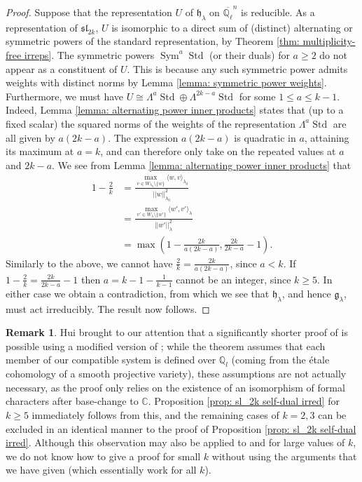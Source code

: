 \documentclass{amsart}
\theoremstyle{definition}
\newtheorem{remark}[theorem]{Remark}
\numberwithin{equation}{section} %
\newcommand{\sllie}{\mathfrak{sl}}
\newcommand{\Sym}{\operatorname{Sym}}
\newcommand{\Std}{\operatorname{Std}}
\newcommand{\Qlbar}{\ensuremath{\overline{\mathbb{Q}_\ell}}}
\newcommand{\bb}[1]{\mathbb{#1}}
\newcommand{\mf}[1]{\mathfrak{#1}}
\begin{document}
\begin{proof}
Suppose that the representation $U$ of $\mf{h}_\lambda$ on $\Qlbar^n$ is reducible.
As a representation of $\sllie_{2k}$, $U$ is isomorphic to a direct sum of (distinct) alternating or symmetric powers of the standard representation, by Theorem \ref{thm: multiplicity-free irreps}.
The symmetric powers $\Sym^a \Std$ (or their duals) for $a \geq 2$ do not appear as a constituent of $U$.
This is because any such symmetric power admits weights with distinct norms by Lemma \ref{lemma: symmetric power weights}.
Furthermore, we must have $U \cong \Lambda^a \Std \oplus \Lambda^{2k-a} \Std$ for some $1 \leq a \leq k-1$.
Indeed, Lemma \ref{lemma: alternating power inner products} states that (up to a fixed scalar) the squared norms of the weights of the representation $\Lambda^a \Std$ are all given by $a(2k-a)$. 
The expression $a(2k-a)$ is quadratic in $a$, attaining its maximum at $a = k$, and can therefore only take on the repeated values at $a$ and $2k-a$.
We see from Lemma \ref{lemma: alternating power inner products} that
\begin{align*}
 1 - \frac{2}{k} &= \frac{\max_{v \in W_{\lambda_0} \setminus \{w\}} \langle w, v \rangle_{\lambda_0}}{||w||_{\lambda_0}^2} \\
 &= \frac{\max_{v' \in W_{\lambda} \setminus \{w'\}} \langle w', v' \rangle_{\lambda}}{||w'||_{\lambda}^2} \\
 &= \max(1- \frac{2k}{a(2k-a)},\frac{2k}{2k-a} - 1).
\end{align*}
Similarly to the above, we cannot have $\frac{2}{k} = \frac{2k}{a(2k-a)}$, since $a < k$.
If $1- \frac{2}{k} = \frac{2k}{2k-a} - 1$ then $a = k-1 - \frac{1}{k-1}$ cannot be an integer, since $k \geq 5$.
In either case we obtain a contradiction, from which we see that $\mf{h}_\lambda$, and hence $\mf{g}_\lambda$, must  act irreducibly.
The result now follows.
\end{proof}

\begin{remark}\label{rmk: hui's comment}
    Hui brought to our attention that a significantly shorter proof of  is possible using a modified version of \cite[Theorem 3.10]{Hui18}; while the theorem assumes that each member of our compatible system is defined over \( \bb{Q}_l \) (coming from the étale cohomology of a smooth projective variety), these assumptions are not actually necessary, as the proof only relies on the existence of an isomorphism of formal characters after base-change to $\bb{C}$.
    Proposition \ref{prop: sl_2k self-dual irred} for $k \geq 5$ immediately follows from this, and the remaining cases of $k=2,3$ can be excluded in an identical manner to the proof of Proposition \ref{prop: sl_2k self-dual irred}. Although this observation may also be applied to  and  for large values of \( k \), we do not know how to give a proof for small \( k \) without using the arguments that we have given (which essentially work for all \( k \)).
\end{remark}
\end{document}
